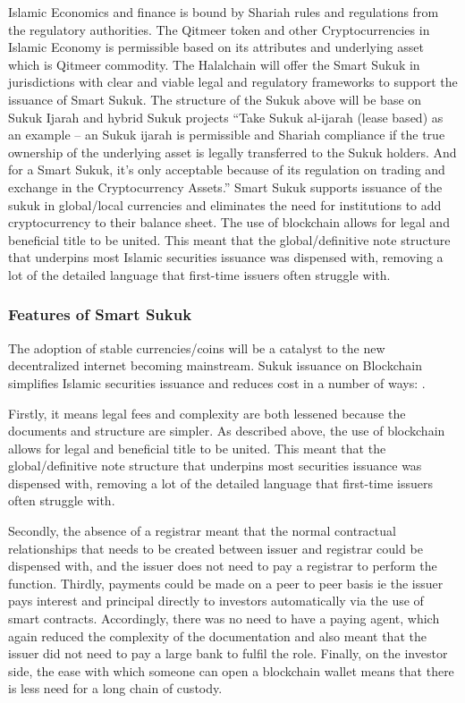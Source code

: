 \documentclass[a4paper,11pt]{article}
\begin{document}
Islamic Economics and finance is bound by Shariah rules and regulations from the regulatory authorities. The Qitmeer token and other Cryptocurrencies in Islamic Economy is permissible based on its attributes and underlying asset which is Qitmeer commodity. The Halalchain will offer the Smart Sukuk in jurisdictions with clear and viable legal and regulatory frameworks to support the issuance of Smart Sukuk. 
The structure of the Sukuk above will be base on Sukuk Ijarah and hybrid Sukuk projects “Take Sukuk al-ijarah (lease based) as an example – an Sukuk ijarah is permissible and Shariah compliance if the true ownership of the underlying asset is legally transferred to the Sukuk holders. And for a Smart Sukuk, it’s only acceptable because of its regulation on trading and exchange in the Cryptocurrency Assets.”
Smart Sukuk supports issuance of the sukuk in global/local currencies and eliminates the need for institutions to add cryptocurrency to their balance sheet. The use of blockchain allows for legal and beneficial title to be united. This meant that the global/definitive note structure that underpins most Islamic securities issuance was dispensed with, removing a lot of the detailed language that first-time issuers often struggle with.

\subsubsection{Features of Smart Sukuk}

The adoption of stable currencies/coins will be a catalyst to the new decentralized internet becoming mainstream. Sukuk issuance on Blockchain simplifies Islamic securities issuance and reduces cost in a number of ways: .

Firstly, it means legal fees and complexity are both lessened because the documents and structure are simpler. As described above, the use of   blockchain allows for legal and beneficial title to be united. This meant that the global/definitive note structure that underpins most securities issuance was dispensed with, removing a lot of the detailed language that first-time issuers often struggle with. 

Secondly, the absence of a registrar meant that the normal contractual relationships that needs to be created between issuer and registrar could be dispensed with, and the issuer does not need to pay a registrar to perform the function. Thirdly, payments could be made on a peer to peer basis ie the issuer pays interest and principal directly to investors automatically via the use of smart contracts. Accordingly, there was no need to have a paying agent, which again reduced the complexity of the documentation and also meant that the issuer did not need to pay a large bank to fulfil the role. Finally, on the investor side, the ease with which someone can open a blockchain wallet means that there is less need for a long chain of custody.
\end{document}
